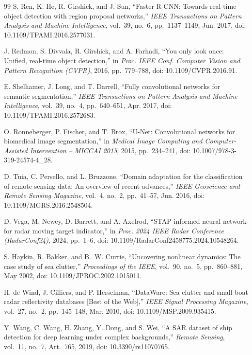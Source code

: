 \documentclass[journal]{IEEEtran}
\begin{document}
\begin{thebibliography}{99}
S. Ren, K. He, R. Girshick, and J. Sun, ``Faster R-CNN: Towards real-time object detection with region proposal networks,'' \emph{IEEE Transactions on Pattern Analysis and Machine Intelligence}, vol.~39, no.~6, pp.~1137--1149, Jun. 2017, doi: 10.1109/TPAMI.2016.2577031.

J. Redmon, S. Divvala, R. Girshick, and A. Farhadi, ``You only look once: Unified, real-time object detection,'' in \emph{Proc. IEEE Conf. Computer Vision and Pattern Recognition (CVPR)}, 2016, pp.~779--788, doi: 10.1109/CVPR.2016.91.

E. Shelhamer, J. Long, and T. Darrell, ``Fully convolutional networks for semantic segmentation,'' \emph{IEEE Transactions on Pattern Analysis and Machine Intelligence}, vol.~39, no.~4, pp.~640--651, Apr. 2017, doi: 10.1109/TPAMI.2016.2572683.

O. Ronneberger, P. Fischer, and T. Brox, ``U-Net: Convolutional networks for biomedical image segmentation,'' in \emph{Medical Image Computing and Computer-Assisted Intervention -- MICCAI 2015}, 2015, pp.~234--241, doi: 10.1007/978-3-319-24574-4\_28.

D. Tuia, C. Persello, and L. Bruzzone, ``Domain adaptation for the classification of remote sensing data: An overview of recent advances,'' \emph{IEEE Geoscience and Remote Sensing Magazine}, vol.~4, no.~2, pp.~41--57, Jun. 2016, doi: 10.1109/MGRS.2016.2548504.

D. Vega, M. Newey, D. Barrett, and A. Axelrod, ``STAP-informed neural network for radar moving target indicator,'' in \emph{Proc. 2024 IEEE Radar Conference (RadarConf24)}, 2024, pp.~1--6, doi: 10.1109/RadarConf2458775.2024.10548264.

S. Haykin, R. Bakker, and B.~W. Currie, ``Uncovering nonlinear dynamics: The case study of sea clutter,'' \emph{Proceedings of the IEEE}, vol.~90, no.~5, pp.~860--881, May 2002, doi: 10.1109/JPROC.2002.1015011.

H. de Wind, J. Cilliers, and P. Herselman, ``DataWare: Sea clutter and small boat radar reflectivity databases [Best of the Web],'' \emph{IEEE Signal Processing Magazine}, vol.~27, no.~2, pp.~145--148, Mar. 2010, doi: 10.1109/MSP.2009.935415.

Y. Wang, C. Wang, H. Zhang, Y. Dong, and S. Wei, ``A SAR dataset of ship detection for deep learning under complex backgrounds,'' \emph{Remote Sensing}, vol.~11, no.~7, Art.~765, 2019, doi: 10.3390/rs11070765.


\end{thebibliography}
\end{document}
